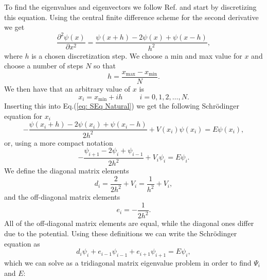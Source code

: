 \documentclass[../main.tex]{subfiles}
\begin{document}
To find the eigenvalues and eigenvectors we follow Ref.\cite{CP1_Project 2} and start by discretizing this equation. Using the central finite difference scheme\cite{Scientific Computing} for the second derivative we get
\begin{equation}
    \frac{\partial^2\psi(x)}{\partial x^2} = \frac{\psi(x+h) - 2\psi(x) + \psi(x-h)}{h^2},
\end{equation}
where $h$ is a chosen discretization step. We choose a min and max value for $x$ and choose a number of steps $N$ so that \begin{equation}
    h = \frac{x_{\mathrm{max}}-x_{\mathrm{min}}}{N}.
\end{equation}
We then have that an arbitrary value of $x$ is 
\begin{equation}
    x_i = x_{\mathrm{min}} + ih \hspace{1cm} i = 0,1,2,\dots,N.
\end{equation}
Inserting this into Eq.(\ref{eq: SEq Natural}) we get the following Schr\"odinger equation for $x_i$
\begin{equation}
    -\frac{\psi(x_i+h) - 2\psi(x_i) + \psi(x_i-h)}{2h^2} + V(x_i)\psi(x_i) = E\psi(x_i),
\end{equation}
or, using a more compact notation
\begin{equation}
    -\frac{\psi_{i+1} - 2\psi_i + \psi_{i-1}}{2h^2} + V_i\psi_i = E\psi_i.
\end{equation}
We define the diagonal matrix elements
\begin{equation}
    d_i = \frac{2}{2h^2} + V_i = \frac{1}{h^2} + V_i,
\end{equation}
and the off-diagonal matrix elements
\begin{equation}
    e_i = -\frac{1}{2h^2}.
\end{equation}
All of the off-diagonal matrix elements are equal, while the diagonal ones differ due to the potential. Using these definitions we can write the Schr\"odinger equation as
\begin{equation}
    d_i\psi_i + e_{i-1}\psi_{i-1} + e_{i+1}\psi_{i+1} = E\psi_i,
\end{equation}
which we can solve as a tridiagonal matrix eigenvalue problem in order to find $\Psi_i$ and $E$:
\end{document}
